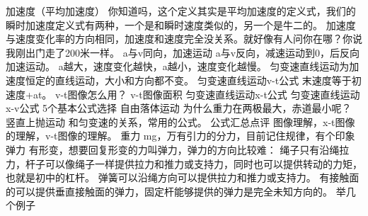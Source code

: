 \markdownRendererInterblockSeparator
{}加速度（平均加速度）\markdownRendererParagraphSeparator
{}你知道吗，这个定义其实是平均加速度的定义式，我们的瞬时加速度定义式有两种，一个是和瞬时速度类似的，另一个是牛二的。\markdownRendererParagraphSeparator
{}加速度与速度变化率的方向相同，加速度和速度完全没关系。就好像有人问你在哪？你说我刚出门走了200米一样。\markdownRendererParagraphSeparator
{}a与v同向，加速运动\markdownRendererSoftLineBreak
{}a与v反向，减速运动到0，后反向加速运动。\markdownRendererSoftLineBreak
{}a越大，速度变化越快，a越小，速度变化越慢。\markdownRendererParagraphSeparator
{}匀变速直线运动为加速度恒定的直线运动，大小和方向都不变。\markdownRendererParagraphSeparator
{}匀变速直线运动v-t公式\markdownRendererSoftLineBreak
{}末速度等于初速度+at。\markdownRendererInterblockSeparator
{}
\markdownRendererSectionEnd \markdownRendererSectionBegin
{}\markdownRendererInterblockSeparator
{}v-t图像怎么用？\markdownRendererParagraphSeparator
{}v-t图像面积\markdownRendererParagraphSeparator
{}匀变速直线运动x-t公式\markdownRendererParagraphSeparator
{}匀变速直线运动x-v公式\markdownRendererInterblockSeparator
{}
\markdownRendererSectionEnd \markdownRendererSectionBegin
{}\markdownRendererInterblockSeparator
{}5个基本公式选择\markdownRendererParagraphSeparator
{}自由落体运动 为什么重力在两极最大，赤道最小呢？\markdownRendererParagraphSeparator
{}竖直上抛运动 和匀变速的关系，常用的公式。\markdownRendererInterblockSeparator
{}
\markdownRendererSectionEnd \markdownRendererSectionBegin
{}\markdownRendererInterblockSeparator
{}公式汇总点评\markdownRendererParagraphSeparator
{}图像理解，x-t图像的理解，v-t图像的理解。\markdownRendererInterblockSeparator
{}
\markdownRendererSectionEnd \markdownRendererSectionBegin
{}\markdownRendererInterblockSeparator
{}重力 mg，万有引力的分力，目前记住规律，有个印象\markdownRendererParagraphSeparator
{}弹力 有形变，想要回复形变的力叫弹力，弹力的方向比较难：\markdownRendererSoftLineBreak
{}绳子只有沿绳拉力，杆子可以像绳子一样提供拉力和推力或支持力，同时也可以提供转动的力矩，也就是初中的杠杆。\markdownRendererSoftLineBreak
{}弹簧可以沿绳方向可以提供拉力和推力或支持力。\markdownRendererSoftLineBreak
{}有接触面的可以提供垂直接触面的弹力，固定杆能够提供的弹力是完全未知方向的。\markdownRendererSoftLineBreak
{}举几个例子\markdownRendererInterblockSeparator
{}
\markdownRendererSectionEnd \markdownRendererSectionBegin

